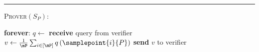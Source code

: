 \documentclass[11pt]{article}
\begin{document}
\begin{protocol}[H]
\begin{ShadedAlgorithmBox}
		
		\noindent\rule{\textwidth}{0.5pt}
		
		\vspace*{0.5em}
		
		\textsc{Prover}$(S_P)$:
		\begin{algorithmic}
			\vspace*{0.2em}
			\Loop \textbf{ forever}:
			\vspace*{0.2em}
			\State $q \gets$ \textbf{receive} query from verifier
			\vspace*{0.5em}
			\State $v \gets \frac{1}{\mP}\sum_{i \in [\mP]}q\left(\samplepoint{i}{P}\right)$
			\vspace*{0.5em}
			\State \textbf{send} $v$ to verifier
			\EndLoop 
		\end{algorithmic}
		
	\end{ShadedAlgorithmBox}
	
	\caption{A PAC verification protocol for statistical query algorithms.}
	\label{protocol:sq-verification}
\end{protocol}
\end{document}
